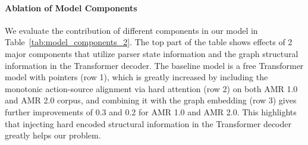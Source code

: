 \begin{table}[!t]
    \centering
     \caption{Ablation study of model components. The analysis is with our base model size.}
    \label{tab:model_components_2}
\end{table}

\paragraph{Ablation of Model Components}
We evaluate the contribution of different components in our model in Table~\ref{tab:model_components_2}.
The top part of the table shows effects of 2 major components that utilize parser state information and the graph structural information in the Transformer decoder. The baseline model is a free Transformer model with pointers (row 1), which is greatly increased by including the  monotonic action-source alignment via hard attention (row 2) on both AMR 1.0 and AMR 2.0 corpus, and combining it with the graph embedding (row 3) gives further improvements of 0.3 and 0.2 for AMR 1.0 and AMR 2.0.
This highlights that injecting hard encoded structural information in the Transformer decoder greatly helps our problem.


